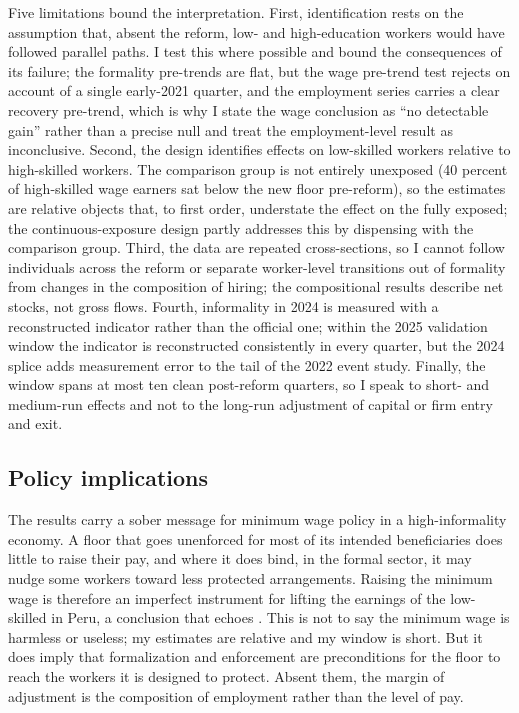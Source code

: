 Five limitations bound the interpretation. First, identification rests on the assumption
that, absent the reform, low- and high-education workers would have followed parallel
paths. I test this where possible and bound the consequences of its failure; the
formality pre-trends are flat, but the wage pre-trend test rejects on account of a single
early-2021 quarter, and the employment series carries a clear recovery pre-trend, which
is why I state the wage conclusion as ``no detectable gain'' rather than a precise null
and treat the employment-level result as inconclusive. Second, the design identifies
effects on low-skilled workers relative to high-skilled workers. The comparison group is
not entirely unexposed (40 percent of high-skilled wage earners sat below the new floor
pre-reform), so the estimates are relative objects that, to first order, understate the
effect on the fully exposed; the continuous-exposure design partly addresses this by
dispensing with the comparison group. Third, the data are repeated cross-sections, so I
cannot follow individuals across the reform or separate worker-level transitions out of
formality from changes in the composition of hiring; the compositional results describe
net stocks, not gross flows. Fourth, informality in 2024 is measured with a reconstructed
indicator rather than the official one; within the 2025 validation window the indicator
is reconstructed consistently in every quarter, but the 2024 splice adds measurement
error to the tail of the 2022 event study. Finally, the window spans at most ten clean
post-reform quarters, so I speak to short- and medium-run effects and not to the long-run
adjustment of capital or firm entry and exit.

\subsection{Policy implications}

The results carry a sober message for minimum wage policy in a high-informality economy. A
floor that goes unenforced for most of its intended beneficiaries does little to raise their
pay, and where it does bind, in the formal sector, it may nudge some workers toward less
protected arrangements. Raising the minimum wage is therefore an imperfect instrument for
lifting the earnings of the low-skilled in Peru, a conclusion that echoes
\citet{jaramillo_lopez_2006}. This is not to say the minimum wage is harmless or useless; my
estimates are relative and my window is short. But it does imply that formalization and
enforcement are preconditions for the floor to reach the workers it is designed to protect.
Absent them, the margin of adjustment is the composition of employment rather than the level of
pay.
